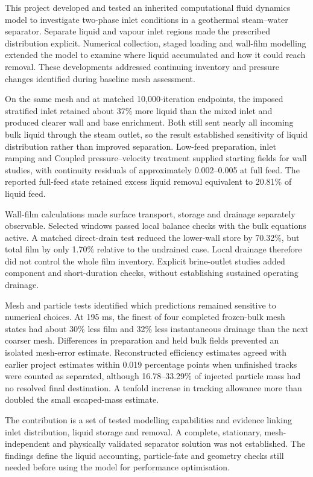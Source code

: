 This project developed and tested an inherited computational fluid dynamics model to investigate two-phase inlet conditions in a geothermal steam--water separator. Separate liquid and vapour inlet regions made the prescribed distribution explicit. Numerical collection, staged loading and wall-film modelling extended the model to examine where liquid accumulated and how it could reach removal. These developments addressed continuing inventory and pressure changes identified during baseline mesh assessment.

On the same mesh and at matched 10,000-iteration endpoints, the imposed stratified inlet retained about 37\% more liquid than the mixed inlet and produced clearer wall and base enrichment. Both still sent nearly all incoming bulk liquid through the steam outlet, so the result established sensitivity of liquid distribution rather than improved separation. Low-feed preparation, inlet ramping and Coupled pressure--velocity treatment supplied starting fields for wall studies, with continuity residuals of approximately 0.002--0.005 at full feed. The reported full-feed state retained excess liquid removal equivalent to 20.81\% of liquid feed.

Wall-film calculations made surface transport, storage and drainage separately observable. Selected windows passed local balance checks with the bulk equations active. A matched direct-drain test reduced the lower-wall store by 70.32\%, but total film by only 1.70\% relative to the undrained case. Local drainage therefore did not control the whole film inventory. Explicit brine-outlet studies added component and short-duration checks, without establishing sustained operating drainage.

Mesh and particle tests identified which predictions remained sensitive to numerical choices. At 195 ms, the finest of four completed frozen-bulk mesh states had about 30\% less film and 32\% less instantaneous drainage than the next coarser mesh. Differences in preparation and held bulk fields prevented an isolated mesh-error estimate. Reconstructed efficiency estimates agreed with earlier project estimates within 0.019 percentage points when unfinished tracks were counted as separated, although 16.78--33.29\% of injected particle mass had no resolved final destination. A tenfold increase in tracking allowance more than doubled the small escaped-mass estimate.

The contribution is a set of tested modelling capabilities and evidence linking inlet distribution, liquid storage and removal. A complete, stationary, mesh-independent and physically validated separator solution was not established. The findings define the liquid accounting, particle-fate and geometry checks still needed before using the model for performance optimisation.
